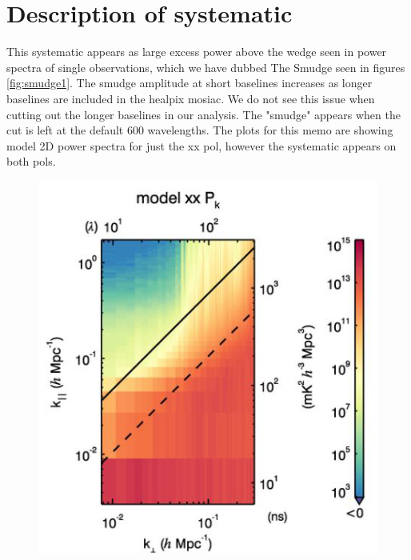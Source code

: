 \documentclass[linenumbers]{aastex631}
\begin{document}
\section{Description of systematic}
This systematic appears as large excess power above the wedge seen in power spectra of single observations, which we have dubbed The Smudge seen in figures \ref{fig:smudge1}. The smudge amplitude at short baselines increases as longer baselines are included in the healpix mosiac. We do not see this issue when cutting out the longer baselines in our analysis. The "smudge" appears when the cut is left at the default 600 wavelengths. The plots for this memo are showing model 2D power spectra for just the xx pol, however the systematic appears on both pols. 
\\
\begin{figure}[htb]
        \centering
        \includegraphics[scale=.5]{default.png}

\end{figure}
\end{document}
